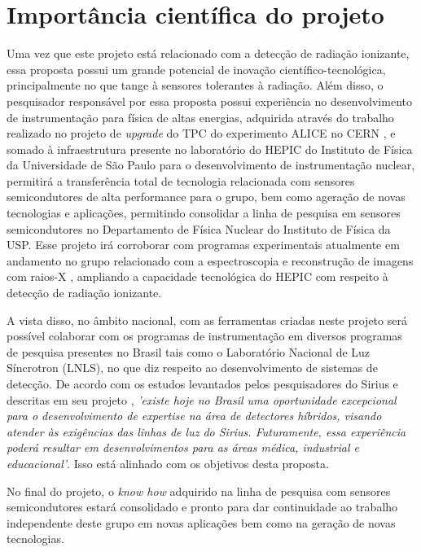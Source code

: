\chapter{Importância científica do projeto}

\thispagestyle{plain}
Uma vez que este projeto está relacionado com a detecção de radiação ionizante, essa proposta possui um grande potencial de inovação científico-tecnológica, principalmente no que tange à sensores tolerantes à radiação. Além disso, o pesquisador responsável por essa proposta possui experiência no desenvolvimento de instrumentação para física de altas energias, adquirida através do trabalho realizado no projeto de {\it upgrade} do TPC do experimento ALICE no CERN \cite{tpcJINST,tpcNIM,discharge_paper,GSI_REPO,THGEM}, e somado à infraestrutura presente no laboratório do HEPIC do Instituto de Física da Universidade de São Paulo para o desenvolvimento de instrumentação nuclear, permitirá a transferência total de tecnologia relacionada com sensores semicondutores de alta performance para o grupo, bem como ageração de novas tecnologias e aplicações, permitindo consolidar a linha de pesquisa em sensores semicondutores no Departamento de Física Nuclear do Instituto de Física da USP. Esse projeto irá corroborar com programas experimentais atualmente em andamento no grupo relacionado com a espectroscopia e reconstrução de imagens com raios-X \cite{THGEM,NIM,xray}, ampliando a capacidade tecnológica do HEPIC com respeito à detecção de radiação ionizante. 
\thispagestyle{plain}

A vista disso, no âmbito nacional, com as ferramentas criadas neste projeto será possível colaborar com os programas de instrumentação em diversos programas de pesquisa presentes no Brasil tais como o Laboratório Nacional de Luz Síncrotron (LNLS), no que diz respeito ao desenvolvimento de sistemas de detecção. De acordo com os estudos levantados pelos pesquisadores do Sirius e descritas em seu projeto \cite{sirius}, {\it 'existe hoje no Brasil uma oportunidade excepcional para o desenvolvimento de expertise na área de detectores híbridos, visando atender às exigências das linhas de luz do Sirius. Futuramente, essa experiência poderá resultar em desenvolvimentos para as áreas médica, industrial e educacional'}. Isso está alinhado com os objetivos desta proposta.

\thispagestyle{plain}
No final do projeto, o {\it know how} adquirido na linha de pesquisa com sensores semicondutores estará consolidado e pronto para dar continuidade ao trabalho independente deste grupo em novas aplicações bem como na geração de novas tecnologias.
\renewcommand{\cleardoublepage}{}
\renewcommand{\clearpage}{}
